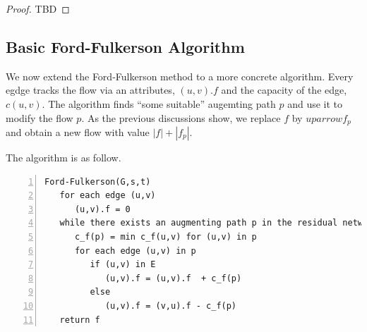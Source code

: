 \begin{proof}
  TBD
\end{proof}

\subsection{Basic Ford-Fulkerson Algorithm}

We now extend the Ford-Fulkerson method to a more concrete algorithm. Every egdge tracks the flow via an attributes, $(u,v).f$ and the capacity of the edge, $c(u,v)$. The algorithm finds ``some suitable'' augemting path $p$ and use it to modify the flow $p$. As the previous discussions show, we replace $f$ by $uparrow f_p$ and obtain a new flow with value $|f| + |f_p|$.  

The algorithm is as follow.

\begin{Verbatim}[numbers=left, xleftmargin=5mm]
Ford-Fulkerson(G,s,t)
   for each edge (u,v)
      (u,v).f = 0
   while there exists an augmenting path p in the residual network G_f
      c_f(p) = min c_f(u,v) for (u,v) in p
      for each edge (u,v) in p
         if (u,v) in E
            (u,v).f = (u,v).f  + c_f(p)
         else
            (u,v).f = (v,u).f - c_f(p)   
   return f
\end{Verbatim}


